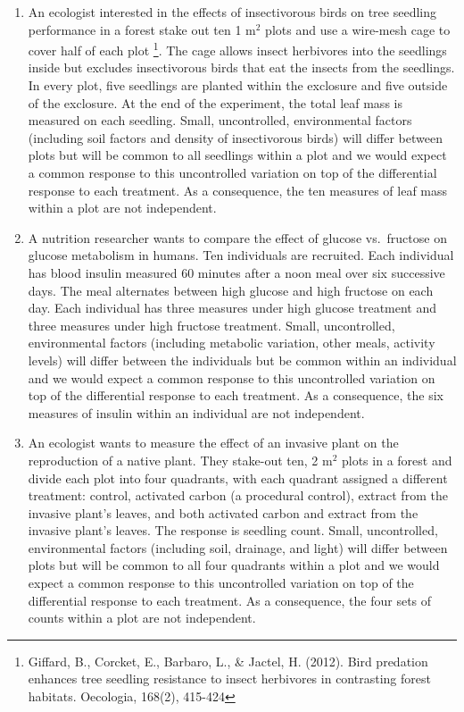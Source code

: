 \documentclass[]{book}
\providecommand{\tightlist}{%
  \setlength{\itemsep}{0pt}\setlength{\parskip}{0pt}}
\let\rmarkdownfootnote\footnote%
\def\footnote{\protect\rmarkdownfootnote}
\begin{document}
\begin{enumerate}
\def\labelenumi{\arabic{enumi}.}
\tightlist
\item
  An ecologist interested in the effects of insectivorous birds on tree seedling performance in a forest stake out ten 1 m\(^2\) plots and use a wire-mesh cage to cover half of each plot \footnote{Giffard, B., Corcket, E., Barbaro, L., \& Jactel, H. (2012). Bird predation enhances tree seedling resistance to insect herbivores in contrasting forest habitats. Oecologia, 168(2), 415-424}. The cage allows insect herbivores into the seedlings inside but excludes insectivorous birds that eat the insects from the seedlings. In every plot, five seedlings are planted within the exclosure and five outside of the exclosure. At the end of the experiment, the total leaf mass is measured on each seedling. Small, uncontrolled, environmental factors (including soil factors and density of insectivorous birds) will differ between plots but will be common to all seedlings within a plot and we would expect a common response to this uncontrolled variation on top of the differential response to each treatment. As a consequence, the ten measures of leaf mass within a plot are not independent.
\item
  A nutrition researcher wants to compare the effect of glucose vs.~fructose on glucose metabolism in humans. Ten individuals are recruited. Each individual has blood insulin measured 60 minutes after a noon meal over six successive days. The meal alternates between high glucose and high fructose on each day. Each individual has three measures under high glucose treatment and three measures under high fructose treatment. Small, uncontrolled, environmental factors (including metabolic variation, other meals, activity levels) will differ between the individuals but be common within an individual and we would expect a common response to this uncontrolled variation on top of the differential response to each treatment. As a consequence, the six measures of insulin within an individual are not independent.
\item
  An ecologist wants to measure the effect of an invasive plant on the reproduction of a native plant. They stake-out ten, 2 m\(^2\) plots in a forest and divide each plot into four quadrants, with each quadrant assigned a different treatment: control, activated carbon (a procedural control), extract from the invasive plant's leaves, and both activated carbon and extract from the invasive plant's leaves. The response is seedling count. Small, uncontrolled, environmental factors (including soil, drainage, and light) will differ between plots but will be common to all four quadrants within a plot and we would expect a common response to this uncontrolled variation on top of the differential response to each treatment. As a consequence, the four sets of counts within a plot are not independent.

\end{enumerate}
\end{document}
